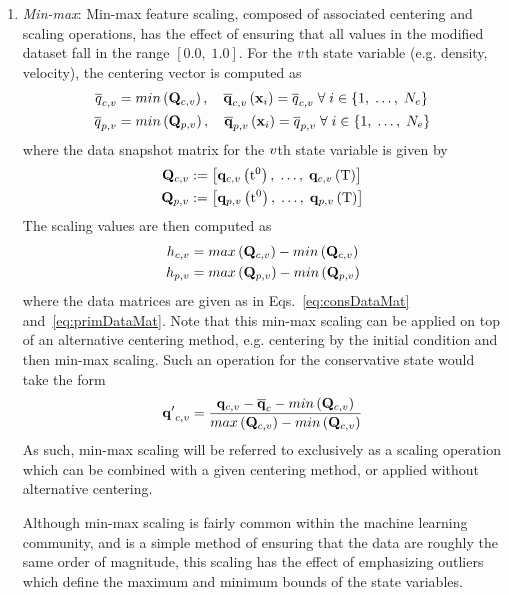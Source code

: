 \begin{enumerate}
	\item \textit{Min-max}: Min-max feature scaling, composed of associated centering and scaling operations, has the effect of ensuring that all values in the modified dataset fall in the range $[0.0, \; 1.0]$. For the $v$th state variable (e.g. density, velocity), the centering vector is computed as
	\begin{align}
		\consValCentVar &= min\left(\consDataMatVar\right), \quad \consVecCentVar\left(\spatialVec_{\dummyIdx}\right) = \consValCentVar \; \forall \; \dummyIdx \in \{1, \; \hdots, \; \numCells\} \\
		\primValCentVar &= min\left(\primDataMatVar\right), \quad \primVecCentVar\left(\spatialVec_{\dummyIdx}\right) = \primValCentVar \; \forall \; \dummyIdx \in \{1, \; \hdots, \; \numCells\}
	\end{align}
	where the data snapshot matrix for the $v$th state variable is given by
	\begin{align}
		\consDataMatVar &\defEq \left[ \consVecVar\left(\initTime\right), \; \hdots, \; \consVecVar\left(\finalTime\right) \right] \label{eq:consDataMat}\\
		\primDataMatVar &\defEq \left[ \primVecVar\left(\initTime\right), \; \hdots, \; \primVecVar\left(\finalTime\right) \right] \label{eq:primDataMat}
	\end{align}
	The scaling values are then computed as
	\begin{align}
		\consScaleVar{\varIdx} &= max\left(\consDataMatVar\right) - min\left(\consDataMatVar\right) \\
		\primScaleVar{\varIdx} &= max\left(\primDataMatVar\right) - min\left(\primDataMatVar\right)
	\end{align}
	where the data matrices are given as in Eqs.~\ref{eq:consDataMat} and~\ref{eq:primDataMat}. Note that this min-max scaling can be applied on top of an alternative centering method, e.g. centering by the initial condition and then min-max scaling. Such an operation for the conservative state would take the form
	\begin{equation}
		\consVecVarUns = \frac{\consVecVar - \consVecCent - min\left(\consDataMatVar\right)}{max\left(\consDataMatVar\right) - min\left(\consDataMatVar\right)}
	\end{equation}
	As such, min-max scaling will be referred to exclusively as a scaling operation which can be combined with a given centering method, or applied without alternative centering.
	
	Although min-max scaling is fairly common within the machine learning community, and is a simple method of ensuring that the data are roughly the same order of magnitude, this scaling has the effect of emphasizing outliers which define the maximum and minimum bounds of the state variables.
\end{enumerate}
